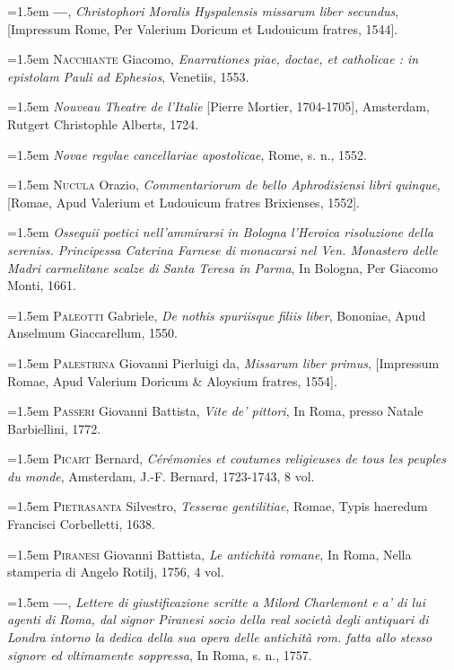 \documentclass[12pt,twoside,openany]{book}
\newenvironment{PurhBibliography}
  {%
    \par
    \setlength{\parindent}{0pt}%
    \setlength{\leftskip}{0pt}%
  }
  {%
    \par
  }
\begin{document}
\begin{PurhBibliography}
\noindent\hangindent=1.5em \textbf{—}, \textit{Christophori Moralis Hyspalensis missarum liber secundus}, [Impressum Rome, Per Valerium Doricum et Ludouicum fratres, 1544].\par
\noindent\hangindent=1.5em \textsc{Nacchiante} Giacomo, \textit{Enarrationes piae, doctae, et catholicae : in epistolam Pauli ad Ephesios}, Venetiis, 1553.\par
\noindent\hangindent=1.5em \textit{Nouveau Theatre de l’Italie }[Pierre Mortier, 1704-1705], Amsterdam, Rutgert Christophle Alberts, 1724.\par
\noindent\hangindent=1.5em \textit{Novae regvlae cancellariae apostolicae}, Rome, s. n., 1552.\par
\noindent\hangindent=1.5em \textsc{Nucula} Orazio, \textit{Commentariorum de bello Aphrodisiensi libri quinque}, [Romae, Apud Valerium et Ludouicum fratres Brixienses, 1552].\par
\noindent\hangindent=1.5em \textit{Ossequii poetici nell’ammirarsi in Bologna l’Heroica risoluzione della sereniss. Principessa Caterina Farnese di monacarsi nel Ven. Monastero delle Madri carmelitane scalze di Santa Teresa in Parma}, In Bologna, Per Giacomo Monti, 1661.\par
\noindent\hangindent=1.5em \textsc{Paleotti} Gabriele, \textit{De nothis spuriisque filiis liber}, Bononiae, Apud Anselmum Giaccarellum, 1550.\par
\noindent\hangindent=1.5em \textsc{Palestrina} Giovanni Pierluigi da, \textit{Missarum liber primus}, [Impressum Romae, Apud Valerium Doricum \& Aloysium fratres, 1554].\par
\noindent\hangindent=1.5em \textsc{Passeri} Giovanni Battista, \textit{Vite de’ pittori}, In Roma, presso Natale Barbiellini, 1772.\par
\noindent\hangindent=1.5em \textsc{Picart} Bernard, \textit{Cérémonies et coutumes religieuses de tous les peuples du monde}, Amsterdam, J.-F. Bernard, 1723-1743, 8 vol.\par
\noindent\hangindent=1.5em \textsc{Pietrasanta} Silvestro, \textit{Tesserae gentilitiae}, Romae, Typis haeredum Francisci Corbelletti, 1638.\par
\noindent\hangindent=1.5em \textsc{Piranesi} Giovanni Battista, \textit{Le antichità romane}, In Roma, Nella stamperia di Angelo Rotilj, 1756, 4 vol.\par
\noindent\hangindent=1.5em \textbf{—}, \textit{Lettere di giustificazione scritte a Milord Charlemont e a’ di lui agenti di Roma, dal signor Piranesi socio della real società degli antiquari di Londra intorno la dedica della sua opera delle antichità rom. fatta allo stesso signore ed vltimamente soppressa}, In Roma, s. n., 1757.\par

\end{PurhBibliography}
\end{document}
